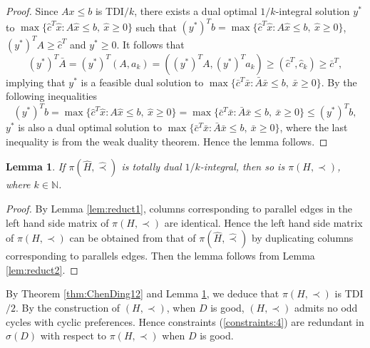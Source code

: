 \documentclass[11pt]{article}
\newtheorem{lemma}[theorem]{Lemma}
\numberwithin{theorem}{section}
\begin{document}
\begin{proof}
Since $Ax\leq b$ is TDI$/k$, there exists a dual optimal $1/k$-integral solution $y^*$ to $\max\{\hat{c}^T\hat{x}:A\hat{x}\leq b,~\hat{x}\geq 0\}$ such that $(y^*)^T b=\max\{\hat{c}^T \hat{x}:A\hat{x}\leq b,~\hat{x}\geq 0\}$, $(y^*)^T A\geq \hat{c}^T$ and $y^*\geq 0$. It follows that
\begin{equation*}
(y^*)^T \bar{A}=(y^*)^T (A,a_k)=((y^*)^T A,(y^*)^T a_k)\geq (\hat{c}^T,\hat{c}_k)\geq\bar{c}^T,
\end{equation*}
implying that $y^*$ is a feasible dual solution to $\max\{\bar{c}^T \bar{x}:\bar{A}\bar{x}\leq b,~\bar{x}\geq 0\}$. By the following inequalities
\begin{equation*}
(y^*)^T b=\max\{\hat{c}^T \hat{x}:A\hat{x}\leq b,~\hat{x}\geq 0\}=\max\{\bar{c}^T \bar{x}:\bar{A}\bar{x}\leq b,~\bar{x}\geq 0\}\leq (y^*)^T b,
\end{equation*} $y^*$ is also a dual optimal solution to $\max\{\bar{c}^T \bar{x}:\bar{A}\bar{x}\leq b,~\bar{x}\geq 0\}$, where the last inequality is from the weak duality theorem. Hence the lemma follows.
\end{proof}

\begin{lemma}
\label{lem:reduct3}
If $\pi(\hat{H},\hat\prec)$ is totally dual $1/k$-integral, then so is $\pi(H,\prec)$, where $k\in\mathbb{N}$.
\end{lemma}
\begin{proof}
By Lemma \ref{lem:reduct1}, columns corresponding to parallel edges in the left hand side matrix of $\pi(H,\prec)$ are identical. Hence the left hand side matrix of $\pi(H,\prec)$ can be obtained from that of $\pi(\hat{H},\hat\prec)$ by duplicating columns corresponding to parallels edges. Then the lemma follows from Lemma \ref{lem:reduct2}.
\end{proof}

By Theorem \ref{thm:ChenDing12} and Lemma \ref{lem:reduct3}, we deduce that $\pi(H,\prec)$ is TDI$/2$. By the construction of $(H,\prec)$, when $D$ is good, $(H,\prec)$ admits no odd cycles with cyclic preferences. Hence constraints (\ref{constraints:4}) are redundant in $\sigma(D)$ with respect to $\pi(H,\prec)$ when $D$ is good.
\end{document}
